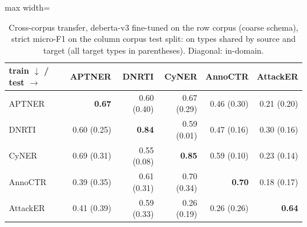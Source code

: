 \begin{table}[t]
\centering
\caption{Cross-corpus transfer, deberta-v3 fine-tuned on the row corpus (coarse schema), strict micro-F1 on the column corpus test split: on types shared by source and target (all target types in parentheses). Diagonal: in-domain.}
\label{tab:transfer_deberta-v3}
\small
\begin{adjustbox}{max width=\textwidth}
\begin{tabular}{lrrrrr}
\toprule
train $\downarrow$ / test $\rightarrow$ & APTNER & DNRTI & CyNER & AnnoCTR & AttackER \\
\midrule
APTNER & \textbf{0.67} & 0.60 (0.40) & 0.67 (0.29) & 0.46 (0.30) & 0.21 (0.20) \\
DNRTI & 0.60 (0.25) & \textbf{0.84} & 0.59 (0.01) & 0.47 (0.16) & 0.30 (0.16) \\
CyNER & 0.69 (0.31) & 0.55 (0.08) & \textbf{0.85} & 0.59 (0.10) & 0.23 (0.14) \\
AnnoCTR & 0.39 (0.35) & 0.61 (0.31) & 0.70 (0.34) & \textbf{0.70} & 0.18 (0.17) \\
AttackER & 0.41 (0.39) & 0.59 (0.33) & 0.26 (0.19) & 0.26 (0.26) & \textbf{0.64} \\
\bottomrule
\end{tabular}
\end{adjustbox}
\end{table}
